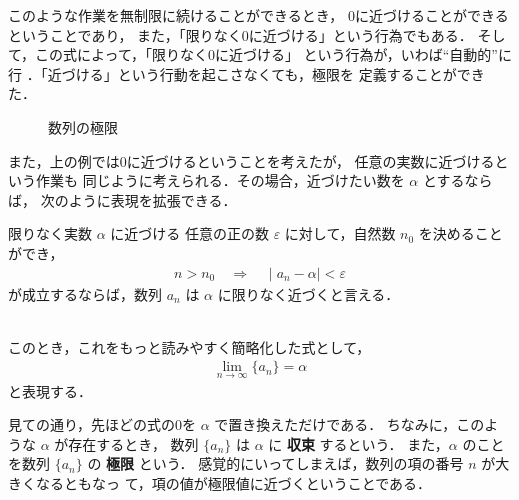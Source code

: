                 このような作業を無制限に続けることができるとき，
                0に近づけることができるということであり，
                また，「限りなく0に近づける」という行為でもある．
                そして，この式によって，「限りなく0に近づける」
                という行為が，いわば“自動的”に行
                ．「近づける」という行動を起こさなくても，極限を
                定義することができた．
                    \begin{figure}[hbt]
                        \begin{center}
                            \caption{数列の極限}
                            \label{fig:suretu_kyokugen1}
                        \end{center}
                    \end{figure}

                また，上の例では0に近づけるということを考えたが，
                任意の実数に近づけるという作業も
                同じように考えられる．その場合，近づけたい数を $\alpha$ とするならば，
                次のように表現を拡張できる．
                    \\
                    \begin{itembox}[l]{限りなく実数 $\alpha $ に近づける}
                        任意の正の数 $\varepsilon$ に対して，自然数 $n_{0}$ を決めることができ，
                            \begin{align}
                                n>n_{0} \quad \Rightarrow \quad
                                \mid a_{n}-\alpha  \mid < \varepsilon
                            \end{align}
                        が成立するならば，数列 $a_{n}$ は $\alpha$ に限りなく近づくと言える．
                    \end{itembox}
                    \\

                このとき，これをもっと読みやすく簡略化した式として，
                    \begin{align}
                        \lim_{n\rightarrow \infty } \{ a_{n} \} = \alpha
                    \end{align}
                と表現する．


                見ての通り，先ほどの式の0を $\alpha$ で置き換えただけである．
                ちなみに，このような $\alpha $ が存在するとき，
                数列 $\{a_{n}\}$ は $\alpha$ に \textbf{収束} するという．
                また，$\alpha$ のことを数列 $\{ a_{n}\}$ の \textbf{極限} という．
                感覚的にいってしまえば，数列の項の番号 $n$ が大きくなるともなっ
                て，項の値が極限値に近づくということである．

